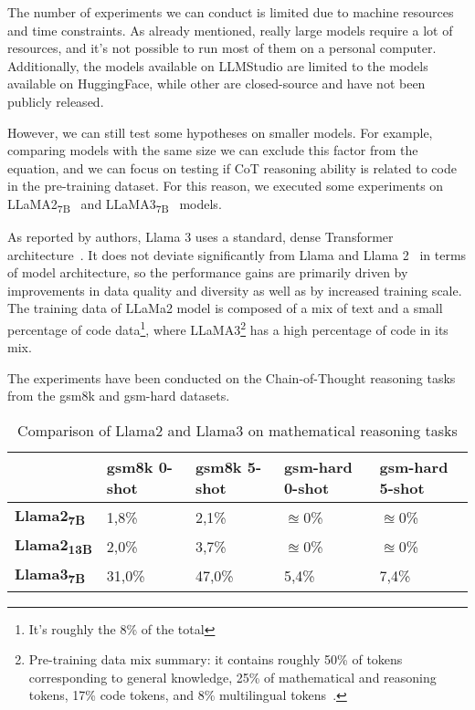 The number of experiments we can conduct is limited due to machine resources and time constraints.
As already mentioned, really large models require a lot of resources, and it's not possible to run most of them on a personal computer.
Additionally, the models available on LLMStudio are limited to the models available on HuggingFace, while other are closed-source and have not been publicly released.

However, we can still test some hypotheses on smaller models.
For example, comparing models with the same size we can exclude this factor from the equation, and we can focus on testing if CoT reasoning ability is related to code in the pre-training dataset.
For this reason, we executed some experiments on LLaMA2\textsubscript{7B}~\cite{touvron2023llama2} and LLaMA3\textsubscript{7B}~\cite{llama3modelcard} models.

As reported by authors, Llama 3 uses a standard, dense Transformer architecture~\cite{vaswani2023attention}.
It does not deviate significantly from Llama and Llama 2~\cite{touvron2023llama2} in terms of model architecture, so the performance gains are primarily driven by improvements in data quality and diversity as well as by increased training scale.
The training data of LLaMa2 model is composed of a mix of text and a small percentage of code data\footnote{It's roughly the 8\% of the total\cite{touvron2023llama2}}, where LLaMA3\footnote{Pre-training data mix summary: it contains roughly 50\% of tokens corresponding to general knowledge, 25\% of mathematical and reasoning tokens, 17\% code tokens, and 8\% multilingual tokens~\cite{llama3}.} has a high percentage of code in its mix.

The experiments have been conducted on the Chain-of-Thought reasoning tasks from the gsm8k and gsm-hard datasets.

\begin{table}[h!]
	\centering
	\begin{tabularx}{\textwidth}{|X|X|X|X|X|}
		\hline
		                                   & \textbf{gsm8k 0-shot} & \textbf{gsm8k 5-shot} & \textbf{gsm-hard 0-shot} & \textbf{gsm-hard 5-shot} \\
		\hline
		\textbf{Llama2\textsubscript{7B}}  & 1,8\%                 & 2,1\%                 & $\approxeq$0\%           & $\approxeq$0\%           \\
		\hline
		\textbf{Llama2\textsubscript{13B}} & 2,0\%                 & 3,7\%                 & $\approxeq$0\%           & $\approxeq$0\%           \\
		\hline
		\textbf{Llama3\textsubscript{7B}}  & 31,0\%                & 47,0\%                & 5,4\%                    & 7,4\%                    \\
		\hline
	\end{tabularx}
	\caption{Comparison of Llama2 and Llama3 on mathematical reasoning tasks}
	\label{tab:llama-comparison}
\end{table}

